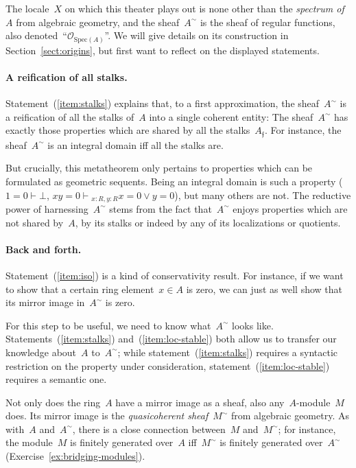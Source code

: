 \documentclass{ws-rv9x6}
\renewcommand{\O}{\mathcal{O}}
\newcommand{\fff}{\mathfrak{f}}
\newcommand{\Spec}{\mathrm{Spec}}
\renewcommand{\_}{\mathpunct{.}}
\newcommand{\?}{\,{:}\,}
\newcommand{\seq}[1]{\mathrel{\vdash\!\!\!_{#1}}}
\begin{document}
The locale~$X$ on which this theater plays out is none other than the
\emph{spectrum of~$A$} from algebraic geometry, and the sheaf~$A^\sim$ is the
sheaf of regular functions, also denoted~``$\O_{\Spec(A)}$''. We will give details on its construction in
Section~\ref{sect:origins}, but first want to reflect on the displayed
statements.

\paragraph{A reification of all stalks.}
Statement~(\ref{item:stalks}) explains that, to a first approximation, the
sheaf~$A^\sim$ is a reification of all the stalks of~$A$ into a single coherent
entity: The sheaf~$A^\sim$ has exactly those properties which are shared by all
the stalks~$A_\fff$. For instance, the sheaf~$A^\sim$ is an integral domain iff
all the stalks are.

But crucially, this metatheorem only pertains to properties which can be
formulated as geometric sequents. Being an integral domain is such a property
($1 = 0 \vdash \bot$, $xy = 0 \seq{x:R,y:R} x = 0 \vee y = 0$), but many others
are not. The reductive power of harnessing~$A^\sim$ stems from the fact
that~$A^\sim$ enjoys properties which are not shared by~$A$, by its stalks or
indeed by any of its localizations or quotients.

\paragraph{Back and forth.}
Statement~(\ref{item:iso}) is a kind of conservativity result.
For instance, if we
want to show that a certain ring element~$x \in A$ is zero, we can just as well
show that its mirror image in~$A^\sim$ is zero.

For this step to be useful, we need to know what~$A^\sim$ looks like.
Statements~(\ref{item:stalks}) and~(\ref{item:loc-stable}) both allow us to
transfer our knowledge about~$A$ to~$A^\sim$; while
statement~(\ref{item:stalks}) requires a syntactic restriction on the property
under consideration, statement~(\ref{item:loc-stable}) requires a semantic one.

Not only does the ring~$A$ have a mirror image as a sheaf, also
any~$A$-module~$M$ does. Its mirror image is the \emph{quasicoherent
sheaf}~$M^\sim$ from algebraic geometry. As with~$A$ and~$A^\sim$, there is a
close connection between~$M$ and~$M^\sim$; for instance, the module~$M$ is
finitely generated over~$A$ iff~$M^\sim$ is finitely generated over~$A^\sim$
(Exercise~\ref{ex:bridging-modules}).
\end{document}
